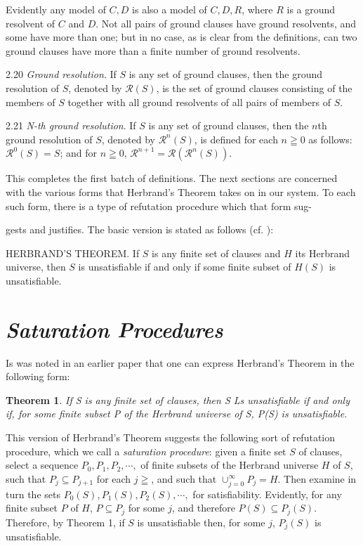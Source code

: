 \documentclass[8pt]{extarticle}
\begin{document}
Evidently any model of ${C,D}$ is also a model of ${C,D,R}$, where $R$ is a ground resolvent of $C$ and $D$. Not all pairs of ground clauses have ground resolvents, and some have more than one; but in no case, as is clear from the definitions, can two ground clauses have more than a finite number of ground resolvents.

2.20 \emph{Ground resolution}. If $S$ is any set of ground clauses, then the ground resolution of $S$, denoted by $\mathscr{R}(S)$, is the set of ground clauses consisting of the members of $S$ together with all ground resolvents of all pairs of members of $S$.

2.21 \emph{N-th ground resolution}. If $S$ is any set of ground clauses, then the $n$th ground resolution of $S$, denoted by $\mathscr{R}^n(S)$, is defined for each $n\geqq 0$ as follows: $\mathscr{R}^0(S) = S$; and for $n\geqq 0$, $\mathscr{R}^{n+1} = \mathscr{R}(\mathscr{R}^n(S))$.

This completes the first batch of definitions. The next sections are concerned with the various forms that Herbrand's Theorem takes on in our system. To each such form, there is a type of refutation procedure which that form sug-

\newpage

\noindent gests and justifies. The basic version is stated as follows (cf. \cite{davis_1960,gilmore_1960}):

HERBRAND'S THEOREM. If $S$ is any finite set of clauses and $H$ its Herbrand universe, then $S$ is unsatisfiable if and only if some finite subset of $H(S)$ is unsatisfiable.

\section{\emph{Saturation Procedures}}

Is was noted in an earlier paper \cite{robinson_1963} that one can express Herbrand's Theorem in the following form:

\newtheorem{theorem}{Theorem}
\begin{theorem}
If S is any finite set of clauses, then S Ls unsatisfiable if and only if, for some finite subset P of the Herbrand universe of S, P(S) is unsatisfiable. 
\end{theorem}

This version of Herbrand's Theorem suggests the following sort of refutation procedure, which we call a \emph{saturation procedure}: given a finite set $S$ of clauses, select a sequence $P_0, P_1, P_2, \dotsm ,$ of finite subsets of the Herbrand universe $H$ of $S$, such that $P_j \subseteq P_{j+1}$ for each $j\geqq$, and such that  $\cup_{j=0}^\infty P_j = H$. Then examine in turn the sets $P_0(S),P_1(S),P_2(S), \dotsm ,$ for satisfiability. Evidently, for any finite subset $P$ of $H$, $P \subseteq P_j$ for some $j$, and therefore $P(S) \subseteq P_j(S)$. Therefore, by Theorem 1, if $S$ is unsatisfiable then, for some $j$, $P_j(S)$ is unsatisfiable.
\end{document}
